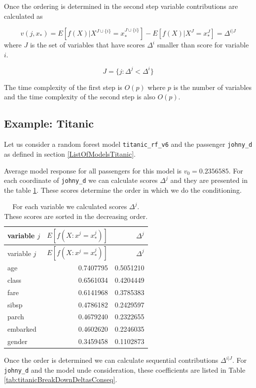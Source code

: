 \documentclass[12pt,]{krantz}
\theoremstyle{definition}
\theoremstyle{definition}
\theoremstyle{definition}
\theoremstyle{remark}
\begin{document}
Once the ordering is determined in the second step variable
contributions are calculated as

\[
v(j, x_*) = E [f(X) | X^{J \cup \{i\}} = x^{J \cup \{i\}}_*] - E [f(X) | X^{J} = x^{J}_*]  = \Delta ^{i|J}
\] where \(J\) is the set of variables that have scores \(\Delta^i\)
smaller than score for variable \(i\).

\[
J = \{j: \Delta^{j} < \Delta^{i}\}
\]

The time complexity of the first step is \(O(p)\) where \(p\) is the
number of variables and the time complexity of the second step is also
\(O(p)\).

\hypertarget{example-titanic}{%
\subsection{Example: Titanic}\label{example-titanic}}

Let us consider a random forest model \texttt{titanic\_rf\_v6} and the
passenger \texttt{johny\_d} as defined in section
\ref{ListOfModelsTitanic}.

Average model response for all passengers for this model is
\(v_0 = 0.2356585\). For each coordinate of \texttt{johny\_d} we can
calculate scores \(\Delta^j\) and they are presented in the table
\ref{tab:titanicBreakDownDeltas}. These scores determine the order in
which we do the conditioning.

\begin{longtable}[]{@{}lrr@{}}
\caption{\label{tab:titanicBreakDownDeltas} For each variable we calculated
scores \(\Delta^j\). These scores are sorted in the decreasing
order.}\tabularnewline
\toprule
variable \(j\) & \(E[f(X : x^j = x^j_*)]\) & \(\Delta^j\)\tabularnewline
\midrule
\endfirsthead
\toprule
variable \(j\) & \(E[f(X : x^j = x^j_*)]\) & \(\Delta^j\)\tabularnewline
\midrule
\endhead
age & 0.7407795 & 0.5051210\tabularnewline
class & 0.6561034 & 0.4204449\tabularnewline
fare & 0.6141968 & 0.3785383\tabularnewline
sibsp & 0.4786182 & 0.2429597\tabularnewline
parch & 0.4679240 & 0.2322655\tabularnewline
embarked & 0.4602620 & 0.2246035\tabularnewline
gender & 0.3459458 & 0.1102873\tabularnewline
\bottomrule
\end{longtable}

Once the order is determined we can calculate sequential contributions
\(\Delta^{i|J}\). For \texttt{johny\_d} and the model unde
consideration, these coefficients are listed in Table
\ref{tab:titanicBreakDownDeltasConseq}.
\end{document}
